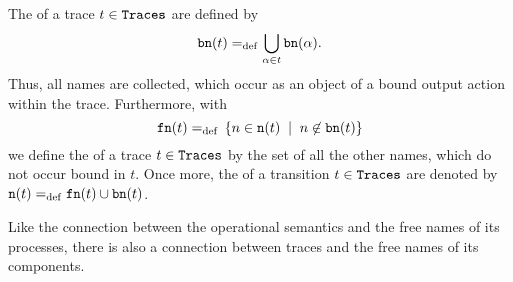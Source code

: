 \begin{definition}
\label{def_bound_free_names_traces}
The  of a trace $t\in\mathtt{Traces}$ are defined by
\[\mathtt{bn}(t)=_{\mathrm{def}}\bigcup_{\alpha\in{}t}\mathtt{bn}(\alpha).\]
Thus, all names are collected, which occur as an object of a bound output action within the trace. Furthermore, with
\[\fn{t}\define{}\set[n\nin\bn{t}]{n\in\n{t}}\]
we define the  of a trace $t\in\mathtt{Traces}$ by the set of all the other names, which do not occur bound in $t$. Once more, the  of a transition $t\in\mathtt{Traces}$ are denoted by $
\mathtt{n}(t)=_{\mathrm{def}}{}\mathtt{fn}(t)\cup\mathtt{bn}(t)$.
\end{definition}

Like the connection between the operational semantics and the free names of its processes, there is also a connection between traces and the free names of its components.

